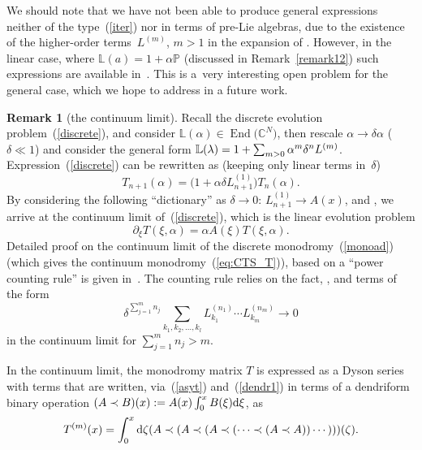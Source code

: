 \documentclass[10pt,a4paper]{amsart}
\numberwithin{equation}{section}
\theoremstyle{definition}
\newtheorem{rem}[thm]{Remark}
\DeclareMathOperator{\EEnd}{End}%
\def\mathcal#1{#1}%
\begin{document}
We should note that we have not been able to produce general expressions neither of the type~(\ref{iter}) nor in terms of pre-Lie algebras, due to the existence of the higher-order terms~$L^{(m)}$, ${m>1}$ in the expansion of . However, in the linear case, where ${{\mathbb L}(a) = 1+ \alpha {\mathbb P}}$ (discussed in Remark~\ref{remark12}) such expressions are available in~\cite{Fer, EbraMan}. This is a~very interesting open problem for the general case, which we hope to address in a future work.

\begin{rem}[the continuum limit]\label{remcont}
Recall the discrete
evolution problem~(\ref{discrete}), and consider ${\mathbb L}(\alpha) \in \EEnd\bigl({\mathbb C}^{\mathcal N}\bigr)$,
then rescale $\alpha \to \delta \alpha$ ($\delta \ll 1 $) and consider the general form
${\mathbb L}(\lambda) = 1 + \smash{\sum_{m>0} \alpha^m \delta^n L^{(m)}}$. Expression~(\ref{discrete})
can be rewritten as (keeping only linear terms in~$\delta$)
\begin{equation*}
T_{n+1}(\alpha) = \bigl(1+ \alpha \delta L^{(1)}_{n+1} \bigr) T_n(\alpha).
\end{equation*}
By considering the following ``dictionary'' as $\delta \to 0$:
$L^{(1)}_{n+1} \to A(x)$, and ,
we arrive at the continuum limit of~(\ref{discrete}), which is the linear evolution problem
\begin{equation*}
\partial_{\xi} T(\xi, \alpha) = \alpha A(\xi) T(\xi, \alpha).
\end{equation*}
 Detailed proof on the continuum
limit of the discrete monodromy~(\ref{monoad}) (which gives the
continuum monodromy~(\ref{eq:CTS_T})), based on a ``power counting rule'' is given in~\cite{AvanDoikouSfetsos}.
The counting rule relies on the fact, , and terms of the form
\[
\delta^{\sum_{j=1}^m n_j}\sum_{k_1, k_2,\dots ,k_l} L_{k_1}^{(n_1)}\cdots L_{k_m}^{(n_{m})} \to 0
\]
in the continuum limit for $\sum_{j=1}^m n_j > m$.
\end{rem}

In the continuum limit, the monodromy matrix $T$ is expressed as a Dyson series with terms that are written, via~(\ref{asyt}) and~(\ref{dendr1}) in terms of a dendriform binary operation $ (A\prec B)(x) := \smash{A(x) \int_0^x B(\xi) {\rm d}\xi}$, as
\begin{eqnarray*}
T^{(m)}(x) =\int_{0}^x{\rm d}\zeta (A\prec (A\prec
(A\prec (\cdots \prec(A \prec A)) \cdots )))(\zeta).%
\end{eqnarray*}
\end{document}
